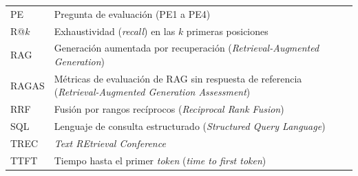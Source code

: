 {\begin{longtable}[l]{>{\raggedright\arraybackslash}p{2.2cm}>{\raggedright\arraybackslash}p{12cm}}
PE & Pregunta de evaluación (PE1 a PE4) \\
R@$k$ & Exhaustividad (\textit{recall}) en las $k$ primeras posiciones \\
RAG & Generación aumentada por recuperación (\textit{Retrieval-Augmented Generation}) \\
RAGAS & Métricas de evaluación de RAG sin respuesta de referencia (\textit{Retrieval-Augmented Generation Assessment}) \\
RRF & Fusión por rangos recíprocos (\textit{Reciprocal Rank Fusion}) \\
SQL & Lenguaje de consulta estructurado (\textit{Structured Query Language}) \\
TREC & \textit{Text REtrieval Conference} \\
TTFT & Tiempo hasta el primer \textit{token} (\textit{time to first token}) \\
\end{longtable}
}
